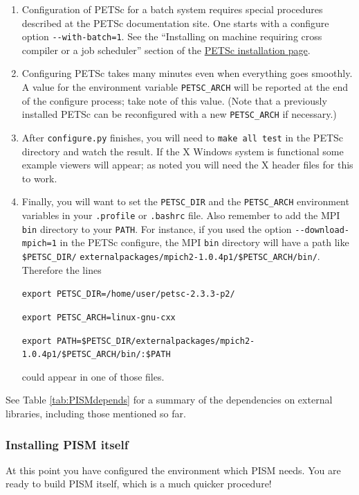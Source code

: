\documentclass[11pt,final]{amsart}
\begin{document}
\begin{enumerate}
\begin{enumerate}
\item Configuration of PETSc for a batch system requires special procedures described at the PETSc documentation site.  One starts with a configure option \verb|--with-batch=1|.  See the ``Installing on machine requiring cross compiler or a job scheduler'' section of the \href{http://www-unix.mcs.anl.gov/petsc/petsc-2/documentation/installation.html}{PETSc installation page}.

\item  Configuring PETSc takes many minutes even when everything goes smoothly.   A value for the environment variable \verb|PETSC_ARCH| will be reported at the end of the configure process; take note of this value.  (Note that a previously installed PETSc can be reconfigured with a new \verb|PETSC_ARCH| if necessary.)

\item  After \verb|configure.py| finishes, you will need to \verb|make all test| in the PETSc directory and watch the result.  If the X Windows system is functional some example viewers will appear; as noted you will need the X header files for this to work.

\item Finally, you will want to set the \verb|PETSC_DIR| and the \verb|PETSC_ARCH| environment variables in your \verb|.profile| or \verb|.bashrc| file.  Also remember to add the MPI \verb|bin| directory to your \verb|PATH|.  For instance, if you used the option \verb|--download-mpich=1| in the PETSc configure, the MPI \verb|bin| directory will have a path like \verb|$PETSC_DIR/| \verb|externalpackages/mpich2-1.0.4p1/$PETSC_ARCH/bin/|.  Therefore the lines 

\small
\verb|export PETSC_DIR=/home/user/petsc-2.3.3-p2/|

\verb|export PETSC_ARCH=linux-gnu-cxx|

\verb|export PATH=$PETSC_DIR/externalpackages/mpich2-1.0.4p1/$PETSC_ARCH/bin/:$PATH|
\normalsize

\noindent could appear in one of those files.
\end{enumerate}
\end{enumerate}

\medskip
See Table \ref{tab:PISMdepends} for a summary of the dependencies on external libraries, including those mentioned so far.


\subsubsection*{Installing PISM itself}
At this point you have configured the environment which PISM needs.  You are ready to build PISM itself, which is a much quicker procedure!
\end{document}
